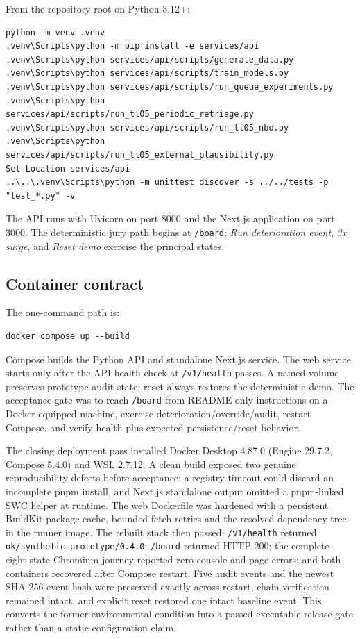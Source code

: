 \documentclass[11pt,a4paper]{article}
\newcommand{\code}[1]{\nolinkurl{#1}}
\begin{document}
From the repository root on Python 3.12+:

\begin{lstlisting}
python -m venv .venv
.venv\Scripts\python -m pip install -e services/api
.venv\Scripts\python services/api/scripts/generate_data.py
.venv\Scripts\python services/api/scripts/train_models.py
.venv\Scripts\python services/api/scripts/run_queue_experiments.py
.venv\Scripts\python services/api/scripts/run_tl05_periodic_retriage.py
.venv\Scripts\python services/api/scripts/run_tl05_nbo.py
.venv\Scripts\python services/api/scripts/run_tl05_external_plausibility.py
Set-Location services/api
..\..\.venv\Scripts\python -m unittest discover -s ../../tests -p "test_*.py" -v
\end{lstlisting}

The API runs with Uvicorn on port 8000 and the Next.js application on port 3000. The deterministic jury path begins at \code{/board}; \emph{Run deterioration event}, \emph{3x surge}, and \emph{Reset demo} exercise the principal states.

\subsection{Container contract}

The one-command path is:

\begin{lstlisting}
docker compose up --build
\end{lstlisting}

Compose builds the Python API and standalone Next.js service. The web service starts only after the API health check at \code{/v1/health} passes. A named volume preserves prototype audit state; reset always restores the deterministic demo. The acceptance gate was to reach \code{/board} from README-only instructions on a Docker-equipped machine, exercise deterioration/override/audit, restart Compose, and verify health plus expected persistence/reset behavior.

The closing deployment pass installed Docker Desktop 4.87.0 (Engine 29.7.2, Compose 5.4.0) and WSL 2.7.12. A clean build exposed two genuine reproducibility defects before acceptance: a registry timeout could discard an incomplete pnpm install, and Next.js standalone output omitted a pnpm-linked SWC helper at runtime. The web Dockerfile was hardened with a persistent BuildKit package cache, bounded fetch retries and the resolved dependency tree in the runner image. The rebuilt stack then passed: \code{/v1/health} returned \code{ok/synthetic-prototype/0.4.0}; \code{/board} returned HTTP 200; the complete eight-state Chromium journey reported zero console and page errors; and both containers recovered after Compose restart. Five audit events and the newest SHA-256 event hash were preserved exactly across restart, chain verification remained intact, and explicit reset restored one intact baseline event. This converts the former environmental condition into a passed executable release gate rather than a static configuration claim.
\end{document}

